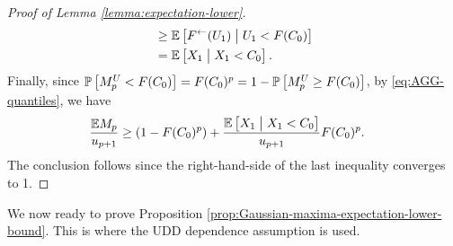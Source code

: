 \begin{proof}[Proof of Lemma \ref{lemma:expectation-lower}]
\begin{align*}
        &\ge \E\left[F^{\leftarrow}(U_1)\;\big|\;U_1 < F(C_0)\right] \\
        &= \E\left[X_1\;\big|\;X_1 < C_0\right].
\end{align*}
Finally, since $\P\left[M^{U}_p < F(C_0)\right] = F(C_0)^p = 1 - \P\left[M^{U}_p \ge F(C_0)\right]$, by \eqref{eq:AGG-quantiles}, we have
\begin{align*}
    \frac{\E M_p}{u_{p+1}} 
        &\ge \left(1 - F(C_0)^p\right) + \frac{\E\left[X_1\;\big|\;X_1 < C_0\right]}{u_{p+1}} F(C_0)^p.
\end{align*}
The conclusion follows since the right-hand-side of the last inequality converges to 1.
\end{proof}


We now ready to prove Proposition \ref{prop:Gaussian-maxima-expectation-lower-bound}. 
This is where the UDD dependence assumption is used.

